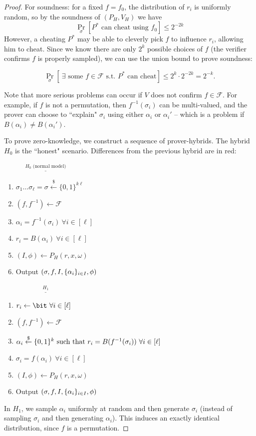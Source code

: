 \begin{proof}
For soundness: for a fixed $f = f_0$, the distribution of $r_i$ is
uniformly random, so by the soundness of $(P_H, V_H)$ we have
$$\Pr_\sigma[\text{$P^*$ can cheat using $f_0$}] \leq 2^{-2k}$$
However, a cheating $P^*$ may be able to cleverly pick $f$ to influence $r_i$,
allowing him to cheat. Since we know there are only $2^k$ possible choices of
$f$ (the verifier confirms $f$ is properly sampled), we can use the union bound
to prove soundness:

$$\Pr_\sigma[~\exists \text{ some $f \in \mathcal{F}$ s.t. $P^*$ can cheat}] \leq 2^{k} \cdot 2^{-2k} = 2^{-k}.$$

Note that more serious problems can occur if $V$ does not confirm $f\in \mathcal{F}$. For example, if $f$ is not a permutation, then
$f^{-1}(\sigma_i)$ can be multi-valued, and the prover can choose to ``explain"
$\sigma_i$ using either $\alpha_i$ or $\alpha_i'$ -- which is a problem if
$B(\alpha_i) \neq B(\alpha_i')$.


To prove zero-knowledge, we construct a sequence of prover-hybrids. The hybrid $H_0$ is the ``honest" scenario. Differences from the previous hybrid are in red:


\newcommand{\htitle}[1]{\vspace{0.3cm}$\overset{#1}{\underline{\hspace{5cm}}}$}
\newcommand{\diff}[1]{{\color{red} #1}}

\htitle{H_0 \text{ (normal model)}}
\begin{enumerate}
    \item $\sigma_1\hdots\sigma_\ell = \sigma \xleftarrow{\$} \{0,1\}^{k\ell}$
    \item $(f, f^{-1}) \gets \mathcal{F}$
    \item $\alpha_i = f^{-1}(\sigma_i) ~\forall i \in [\ell]$
    \item $r_i = B(\alpha_i) ~\forall i \in [\ell]$
    \item $(I, \phi) \gets P_H(r, x, \omega)$
    \item Output $(\sigma, f, I, \{\alpha_i\}_{i \in I}, \phi)$
\end{enumerate}

\htitle{H_1}
\begin{enumerate}
    \item \diff{$r_i \gets \bit ~\forall i \in [\ell]$}
    \item $(f, f^{-1}) \gets \mathcal{F}$
    \item \diff{$\alpha_i \rgets \{0, 1\}^k\ \text{such that}\ r_i = B(f^{-1}(\sigma_i)) ~\forall i \in [\ell]$}
    \item \diff{$\sigma_i = f(\alpha_i) ~\forall i \in [\ell]$}
    \item $(I, \phi) \gets P_H(r, x, \omega)$
    \item Output $(\sigma, f, I, \{\alpha_i\}_{i \in I}, \phi)$
\end{enumerate}
In $H_1$, we sample $\alpha_i$ uniformly at random and then generate $\sigma_i$ (instead of
sampling $\sigma_i$ and then generating $\alpha_i$). This induces an exactly identical distribution, since $f$
is a permutation.


\end{proof}
